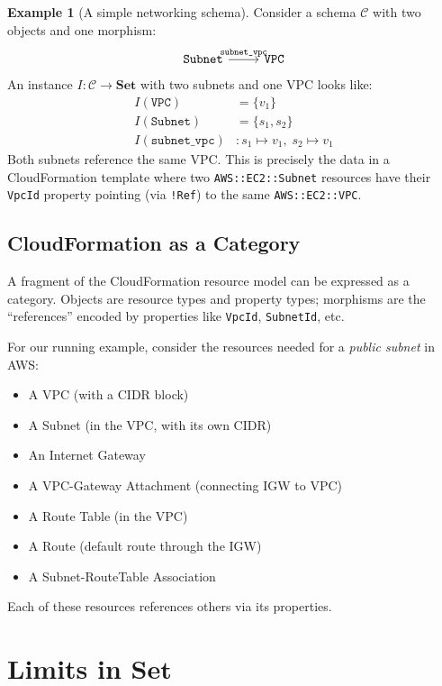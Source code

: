 \documentclass[11pt,a4paper]{article}
\theoremstyle{definition}
\newtheorem{example}{Example}[section]
\theoremstyle{plain}
\newcommand{\Set}{\mathbf{Set}}
\begin{document}
\begin{example}[A simple networking schema]
\label{ex:simple-schema}
Consider a schema $\mathcal{C}$ with two objects and one morphism:
\[
\begin{tikzcd}
\texttt{Subnet} \arrow[r, "\texttt{subnet\_vpc}"] & \texttt{VPC}
\end{tikzcd}
\]
An instance $I \colon \mathcal{C} \to \Set$ with two subnets and one VPC looks like:
\begin{align*}
I(\texttt{VPC}) &= \{ v_1 \} \\
I(\texttt{Subnet}) &= \{ s_1, s_2 \} \\
I(\texttt{subnet\_vpc}) &\colon s_1 \mapsto v_1,\; s_2 \mapsto v_1
\end{align*}
Both subnets reference the same VPC. This is precisely the data in a CloudFormation template where two \texttt{AWS::EC2::Subnet} resources have their \texttt{VpcId} property pointing (via \texttt{!Ref}) to the same \texttt{AWS::EC2::VPC}.
\end{example}

\subsection{CloudFormation as a Category}

A fragment of the CloudFormation resource model can be expressed as a category. Objects are resource types and property types; morphisms are the ``references'' encoded by properties like \texttt{VpcId}, \texttt{SubnetId}, etc.

For our running example, consider the resources needed for a \emph{public subnet} in AWS:
\begin{itemize}
  \item A VPC (with a CIDR block)
  \item A Subnet (in the VPC, with its own CIDR)
  \item An Internet Gateway
  \item A VPC-Gateway Attachment (connecting IGW to VPC)
  \item A Route Table (in the VPC)
  \item A Route (default route through the IGW)
  \item A Subnet-RouteTable Association
\end{itemize}

Each of these resources references others via its properties.

\section{Limits in \texorpdfstring{$\Set$}{Set}}
\end{document}
